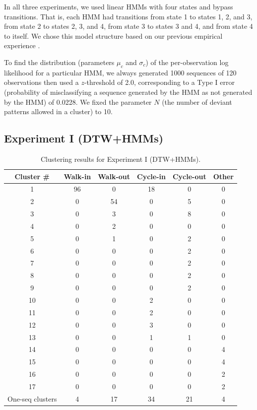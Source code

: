 In all three experiments, we used linear HMMs with four states and
bypass transitions. That is, each HMM had transitions from state 1 to
states 1, 2, and 3, from state 2 to states 2, 3, and 4, from state 3
to states 3 and 4, and from state 4 to itself. We chose this model
structure based on our previous empirical
experience .

To find the distribution (parameters $\mu_c$ and $\sigma_c$) of the
per-observation log likelihood for a particular HMM, we always
generated 1000 sequences of 120 observations then used a $z$-threshold
of 2.0, corresponding to a Type I error (probability of misclassifying
a sequence generated by the HMM as not generated by the HMM) of
0.0228.  We fixed the parameter $N$ (the number of deviant patterns
allowed in a cluster) to 10.

\subsection{Experiment I (DTW+HMMs)}

\begin{table}[t]
  \caption[Clustering results for Experiment I (DTW+HMMs).]{\small
    Clustering results for Experiment I (DTW+HMMs).}
  \label{tab:dtw-and-hmm-assoc-matrix}
  \begin{center}
    \begin{tabular}{c|c|c|c|c|c}
      \hline
      Cluster \# & Walk-in & Walk-out & Cycle-in & Cycle-out & Other \\ 
      \hline \hline
      1  & 96 & 0  & 18 & 0 & 0 \\ \hline
      2  & 0  & 54 & 0  & 5 & 0 \\ \hline
      3  & 0  & 3  & 0  & 8 & 0 \\ \hline
      4  & 0  & 2  & 0  & 0 & 0 \\ \hline
      5  & 0  & 1  & 0  & 2 & 0 \\ \hline
      6  & 0  & 0  & 0  & 2 & 0 \\ \hline
      7  & 0  & 0  & 0  & 2 & 0 \\ \hline
      8  & 0  & 0  & 0  & 2 & 0 \\ \hline
      9  & 0  & 0  & 0  & 2 & 0 \\ \hline
      10 & 0  & 0  & 2  & 0 & 0 \\ \hline
      11 & 0  & 0  & 2  & 0 & 0 \\ \hline
      12 & 0  & 0  & 3  & 0 & 0 \\ \hline
      13 & 0  & 0  & 1  & 1 & 0 \\ \hline
      14 & 0  & 0  & 0  & 0 & 4 \\ \hline
      15 & 0  & 0  & 0  & 0 & 4 \\ \hline
      16 & 0  & 0  & 0  & 0 & 2 \\ \hline
      17 & 0  & 0  & 0  & 0 & 2 \\ \hline
      One-seq clusters & 4 & 17 & 34 & 21 & 4 \\ \hline
    \end{tabular}
  \end{center}
\end{table}

